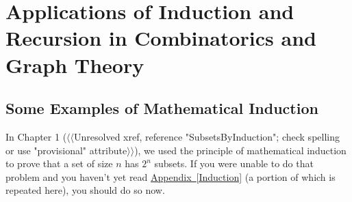 \documentclass[10pt,]{book}
\theoremstyle{plain}
\theoremstyle{definition}
\numberwithin{equation}{chapter}
\begin{document}
\chapter[{Applications of Induction and Recursion in Combinatorics and Graph Theory}]{Applications of Induction and Recursion in Combinatorics and Graph Theory}\label{InductionRecursion}
\typeout{************************************************}
\typeout{************************************************}
\section[{Some Examples of Mathematical Induction}]{Some Examples of Mathematical Induction}\label{sec_induction-examples}
In Chapter 1 ({$\langle\langle$Unresolved xref, reference "SubsetsByInduction"; check spelling or use "provisional" attribute$\rangle\rangle$}), we used the principle of mathematical induction to prove that a set of size \(n\) has \(2^n\) subsets. If you were unable to do that problem and you haven't yet read \hyperref[Induction]{Appendix~\ref{Induction}} (a portion of which is repeated here), you should do so now.%
\typeout{************************************************}
\typeout{************************************************}
\end{document}
